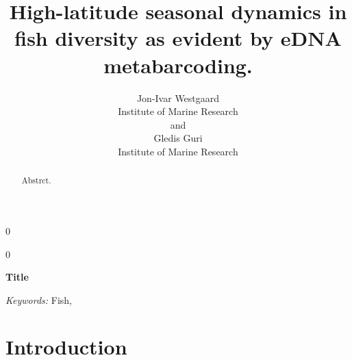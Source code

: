 \documentclass[12pt]{article}
\newcommand{\blind}{0}
\begin{document}
%

\def\spacingset#1{\renewcommand{\baselinestretch}%
{#1}\small\normalsize} \spacingset{1}



\blind
{
  \title{\bf High-latitude seasonal dynamics in fish diversity as evident by eDNA metabarcoding.}
  \author{Jon-Ivar Westgaard\\
    Institute of Marine Research\\
    and \\
    Gledis Guri\\
    Institute of Marine Research}
  \maketitle
} \fi

\blind
{
  \bigskip
  \bigskip
  \bigskip
  \begin{center}
    {\LARGE\bf Title}
\end{center}
  \medskip
} \fi

\bigskip
\begin{abstract}
Abstrct.
\end{abstract}

\noindent%
{\it Keywords:}  Fish, 

\spacingset{1.45}
\section{Introduction}
\label{sec:intro}
\end{document}
